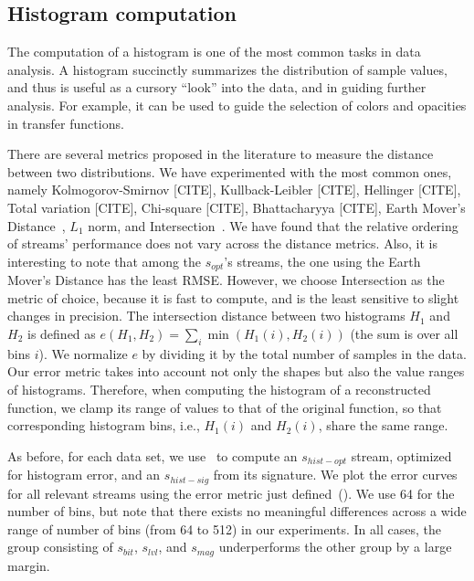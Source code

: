 \subsection{Histogram computation}\label{sec:histogram}


The computation of a histogram is one of the most common tasks in data analysis. A histogram
succinctly summarizes the distribution of sample values, and thus is useful as a cursory ``look''
into the data, and in guiding further analysis. For example, it can be used to guide the selection
of colors and opacities in transfer functions.

There are several metrics proposed in the literature to measure the distance between two
distributions. We have experimented with the most common ones, namely Kolmogorov-Smirnov [CITE],
Kullback-Leibler [CITE], Hellinger [CITE], Total variation [CITE], Chi-square [CITE], Bhattacharyya
[CITE], Earth Mover's Distance~\cite{emd1998}, $L_1$ norm, and
Intersection~\cite{histogram_intersection1991}. We have found that the relative ordering of streams'
performance does not vary across the distance metrics. Also, it is interesting to note that among the
$s_{opt}$'s streams, the one using the Earth Mover's Distance has the least RMSE. However, we choose
Intersection as the metric of choice, because it is fast to compute, and is the least sensitive to
slight changes in precision. The intersection distance between two histograms $H_1$ and $H_2$ is
defined as $e(H_1,H_2)=\sum_{i}{\min{(H_1(i),H_2(i))}}$ (the sum is over all bins $i$). We normalize
$e$ by dividing it by the total number of samples in the data. Our error metric takes into account
not only the shapes but also the value ranges of histograms. Therefore, when computing the histogram
of a reconstructed function, we clamp its range of values to that of the original function, so
that corresponding histogram bins, i.e., $H_1(i)$ and $H_2(i)$, share the same range.

As before, for each data set, we use~ to compute an $s_{hist-opt}$
stream, optimized for histogram error, and an $s_{hist-sig}$ from its signature.
We plot the error curves for all relevant streams using the
error metric just defined~(). We use 64 for the number of bins, but note that there exists no
meaningful differences across a wide range of number of bins (from 64 to 512) in our experiments. In
all cases, the group consisting of $s_{bit}$, $s_{lvl}$, and $s_{mag}$ underperforms the other group
by a large margin.

